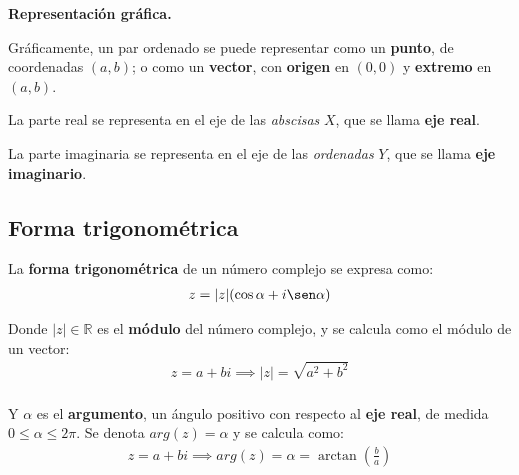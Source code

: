\documentclass[12pt]{article}
\begin{document}
\textbf{Representación gráfica.}

Gráficamente, un par ordenado se puede representar como un \textbf{punto},
de coordenadas \((a,b)\); o como un \textbf{vector},
con \textbf{origen} en \((0,0)\) y \textbf{extremo} en \((a,b)\).

La parte real se representa en el eje de las \textit{abscisas} \(X\),
que se llama \textbf{eje real}.

La parte imaginaria se representa en el eje de las \textit{ordenadas} \(Y\),
que se llama \textbf{eje imaginario}.

\hfil
\begin{center}
\end{center}
\hfil

\subsection{Forma trigonométrica}

La \textbf{forma trigonométrica} de un número complejo se expresa como:
\begin{align*}
    z = |z|(\cos \alpha + i \sen \alpha) \\
\end{align*}

Donde \(|z| \in \mathbb{R}\) es el \textbf{módulo} del número complejo,
y se calcula como el módulo de un vector:
\begin{align*}
    z = a+bi \implies |z| = \sqrt{a^2 + b^2} \\
\end{align*}

Y \(\alpha\) es el \textbf{argumento},
un ángulo positivo con respecto al \textbf{eje real},
de medida \(0 \leq \alpha \leq 2\pi\).
Se denota \(arg(z) = \alpha\) y se calcula como:
\begin{align*}
    z = a + bi \implies arg(z) = \alpha = \arctan \left(\frac{b}{a}\right) \\
\end{align*}
\end{document}
